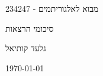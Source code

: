 \documentclass[]{book}
\begin{document}
	
	\begin{center}
		\vspace*{5cm}
		\Huge{מבוא לאלגוריתמים - 234247}

		\vspace{4cm}

		\huge{סיכומי הרצאות}

		\vspace{4cm}

		\Large{גלעד קותיאל}
		
		\today
	\end{center}

	\begingroup
		\let\cleardoublepage\clearpage
		\tableofcontents
	\endgroup

	\renewcommand{\chaptername}{הרצאה}

	
	
	
	
	
	
	
	
	
	
	
	
\end{document}
